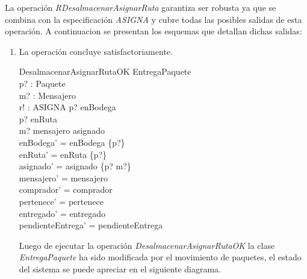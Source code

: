 \documentclass[12pt,a4paper]{article}
\begin{document}
La operación \textit{RDesalmacenarAsignarRuta} garantiza ser robusta ya que se combina con la especificación \textit{ASIGNA} y cubre todas las posibles salidas de esta operación. A continuacion se presentan los esquemas que detallan dichas salidas:
\begin{enumerate}
\item La operación concluye satisfactoriamente.

\begin{schema}{DesalmacenarAsignarRutaOK}
\Delta EntregaPaquete\\
p? : Paquete\\
m? : Mensajero\\
r! : ASIGNA
\where
p? \in enBodega\\
p? \notin  enRuta\\
m? \in mensajero \setminus \ran asignado\\
enBodega' = enBodega \setminus \{p?\}\\
enRuta' = enRuta \cup \{p?\}\\
asignado' = asignado \cup \{p? \mapsto m?\}\\
mensajero' = mensajero\\
comprador' = comprador\\
pertenece' = pertenece\\
entregado' = entregado\\
pendienteEntrega' = pendienteEntrega
\end{schema}

Luego de ejecutar la operación \textit{DesalmacenarAsignarRutaOK} la clase \textit{EntregaPaquete} ha sido modificada por el movimiento de paquetes, el estado del sistema se puede apreciar en el siguiente diagrama.

\begin{figure}[H]
\centering
{}
\end{figure}
\end{enumerate}
\end{document}
